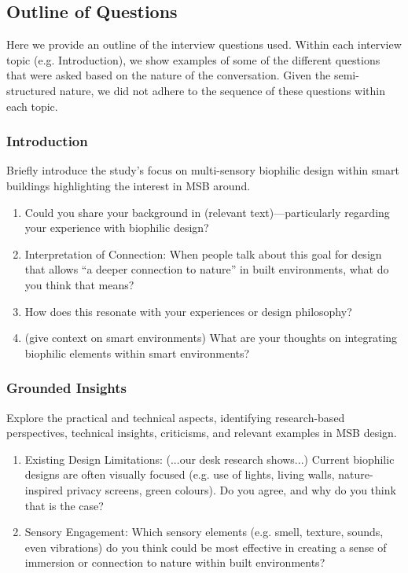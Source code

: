 \subsection{Outline of Questions}
\label{appendix-outline}
Here we provide an outline of the interview questions used. Within each interview topic (e.g. Introduction), we show examples of some of the different questions that were asked based on the nature of the conversation. Given the semi-structured nature, we did not adhere to the sequence of these questions within each topic. 

\subsubsection{Introduction}
Briefly introduce the study's focus on multi-sensory biophilic design within smart buildings highlighting the interest in MSB around.
\begin{enumerate}
    \item Could you share your background in (relevant text)---particularly regarding your experience with biophilic design? 
    \item Interpretation of Connection: When people talk about this goal for design that allows “a deeper connection to nature” in built environments, what do you think that means?
    \item How does this resonate with your experiences or design philosophy?
    \item (give context on smart environments) What are your thoughts on integrating biophilic elements within smart environments?
\end{enumerate}


\subsubsection{Grounded Insights} Explore the practical and technical aspects, identifying research-based perspectives, technical insights, criticisms, and relevant examples in MSB design.
\begin{enumerate}
    \item Existing Design Limitations: (...our desk research shows...) Current biophilic designs are often visually focused (e.g. use of lights, living walls, nature-inspired privacy screens, green colours). Do you agree, and why do you think that is the case? 
    \item Sensory Engagement: Which sensory elements (e.g. smell, texture, sounds, even vibrations) do you think could be most effective in creating a sense of immersion or connection to nature within built environments?
\end{enumerate}


